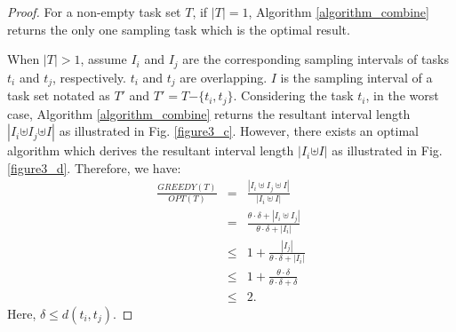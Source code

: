 \documentclass[prodmode,acmtosn]{acmsmall}
\begin{document}
\begin{proof}
For a non-empty task set $T$, if $|T|\mathrm{=}1$,  Algorithm \ref{algorithm_combine} returns the only one sampling task which is the optimal result.

When $|T|\mathrm{>} 1$, assume $I_i$ and $I_j$ are  the corresponding sampling intervals of tasks $t_i$ and $t_j$, respectively. $t_i$ and $t_j$ are overlapping.  $I$ is the sampling interval of a task set notated as $T'$ and $T'\mathrm{=}T\mathrm{-}\{t_i,t_j\}$. Considering the task $t_i$, in the worst case,  Algorithm \ref{algorithm_combine}  returns the resultant interval length  $|I_i \mathrm{\uplus} I_j \mathrm{\uplus} I|$ as illustrated in Fig. \ref{figure3_c}. However, there exists an optimal algorithm which derives the resultant interval length $|I_i \mathrm{\uplus} I|$ as illustrated in Fig. \ref{figure3_d}. Therefore, we have:
\begin{equation}
\begin{array}{lcl}
\frac{\displaystyle GREEDY(T)}{\displaystyle OPT(T)}&=&\frac{\displaystyle |I_i \uplus I_j \uplus I|}{\displaystyle |I_i \uplus I|}\\
       &=&\frac{\displaystyle \theta \cdot \delta+|I_i \uplus I_j|}{\displaystyle \theta \cdot \delta+|I_i|}\\
       &\le&1+\frac{\displaystyle |I_j|}{\displaystyle \theta \cdot \delta+|I_i|}\\
       &\le&1+\frac{\displaystyle \theta \cdot \delta}{\displaystyle \theta \cdot \delta+\delta}\\
       &\le&2.
\end{array}
\end{equation}
Here, $\delta \mathrm{\le}d(t_i,t_j)$.
\end{proof}
\end{document}
